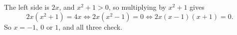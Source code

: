 The left side is $2x$, and $x^2+1>0$, so multiplying by $x^2+1$ gives
\[2x\left(x^2+1\right)=4x\iff 2x\left(x^2-1\right)=0\iff 2x(x-1)(x+1)=0 .\]
So $x=\boxed{-1,\ 0\text{ or }1}$, and all three check.
